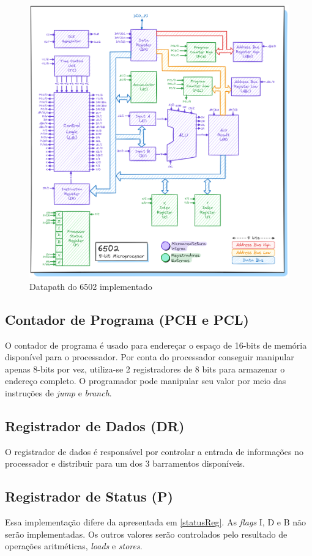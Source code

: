 \documentclass[
	12pt,				  %
	openright,		%
	a4paper,			%
	english,			%
	french,				%
	spanish,			%
	brazil,				%
]{abntex2}
\begin{document}
\begin{figure}[h]
	\centering
	\caption{Datapath do 6502 implementado} \label{fig:6502}
	\includegraphics[scale=0.22]{../assets/img/6502.png}
\end{figure}

\subsection{Contador de Programa (PCH e PCL)}

O contador de programa é usado para endereçar o espaço de 16-bits de memória
disponível para o processador. Por conta do processador conseguir manipular
apenas 8-bits por vez, utiliza-se 2 registradores de 8 bits para armazenar o
endereço completo. O programador pode manipular seu valor por meio das
instruções de \emph{jump} e \emph{branch}.

\subsection{Registrador de Dados (DR)}
O registrador de dados é responsável por controlar a entrada de informações
no processador e distribuir para um dos 3 barramentos disponíveis.

\subsection{Registrador de Status (P)}
Essa implementação difere da apresentada em \ref{statusReg}. As \emph{flags} I,
D e B não serão implementadas.
Os outros valores serão controlados pelo resultado de operações aritméticas,
\emph{loads} e \emph{stores}.
\end{document}
